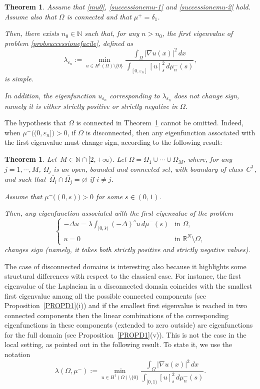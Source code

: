 \documentclass[12pt,a4paper,intlimits,sumlimits]{amsart}
\def \N {\mathbb{N}}
\def \R {\mathbb{R}}
\theoremstyle{definition}
\theoremstyle{plain}
\newtheorem{theorem}[definition]{Theorem}
\renewcommand{\emptyset}{\varnothing}
\numberwithin{equation}{section}
\begin{document}
\begin{theorem}\label{simple>0}
Assume that \eqref{mu0}, \eqref{successionemu-1} and \eqref{successionemu-2} hold. Assume also that $\Omega$ is connected and that $\mu^+=\delta_1$. 

Then, there exists $n_0\in \N$ such that, for any $n>n_0$,
the first eigenvalue of problem \eqref{probsuccessionefacile}, defined as
\[
\lambda_{\varepsilon_n}:=\min_{u\in H^1(\Omega)\setminus\{0\}} \dfrac{\displaystyle \int_\Omega |\nabla u(x)|^2\,dx}{\displaystyle \int_{[0,\varepsilon_n] } [u]^2_s \, d\mu^-_n(s)},
\]
is simple. 

In addition, the eigenfunction $u_{\varepsilon_n}$ corresponding to $\lambda_{\varepsilon_n}$ does not change sign,
namely it is either strictly positive or strictly negative in $\Omega$.
\end{theorem}

The hypothesis that $\Omega$ is connected
in Theorem~\ref{simple>0} cannot be omitted.
Indeed, when $\mu^-\big((0,\varepsilon_n]\big)>0$, if $\Omega$ is disconnected, then any eigenfunction associated with the first eigenvalue must change
sign, according to the following result:

\begin{theorem}\label{propcambiosegno}
Let~$M\in\N\cap[2,+\infty)$.
Let $\Omega=\Omega_1\cup \cdots \cup \Omega_M$, where,
for any $j=1,\cdots,M$,
$\Omega_j$ is an open, bounded and connected set,
with boundary of class~$C^1$,
and such that~$\overline{\Omega_i}\cap\overline{ \Omega_j}=\emptyset$ if $i\neq j$.

Assume that $\mu^-\big((0,\overline s)\big)>0$ for some $\overline s\in (0,1)$.

Then, any eigenfunction associated with the first eigenvalue of the problem
\begin{equation}\label{xfgyxcfghxcfg}
\begin{cases}
-\Delta u= \lambda\displaystyle \int_{[0,\overline s)}(-\Delta)^s u\,d\mu^-(s) &\mbox{in }\Omega,
\\
u=0 &\mbox{in }\R^N \setminus \Omega,
\end{cases}
\end{equation}
changes sign (namely, it takes both strictly positive and strictly negative values).
\end{theorem}

The case of disconnected domains is interesting also because
it highlights some structural differences with respect to the classical case.
For instance, the first eigenvalue of the Laplacian in a disconnected domain
coincides with the smallest first eigenvalue among all the possible connected components (see Proposition~\ref{PROPD1}(i))
and if the smallest first eigenvalue
is reached in two connected components then the linear combinations
of the corresponding eigenfunctions in these components (extended
to zero outside) are eigenfunctions for the full domain (see
Proposition~\ref{PROPD1}(v)). This is not the case
in the local setting, as pointed out in the following result.
To state it, we use the notation
$$\lambda(\Omega,\mu^-):=
\min_{u\in H^1(\Omega)\setminus\{0\}} \dfrac{\displaystyle \int_\Omega |\nabla u(x)|^2\,dx}{\displaystyle \int_{[0,1) } [u]^2_s \, d\mu^-_n(s)}.$$
\end{document}
